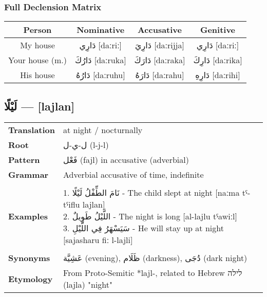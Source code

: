 \documentclass[letterpaper,12pt]{article}
\begin{document}
\subsubsection*{Full Declension Matrix}
\begin{tabular}{|c|c|c|c|}
\hline
\textbf{Person} & \textbf{Nominative} & \textbf{Accusative} & \textbf{Genitive} \\
\hline
My house & \textarabic{دَارِي} [daːriː] & \textarabic{دَارِيَ} [daːrijja] & \textarabic{دَارِي} [daːriː] \\
\hline
Your house (m.) & \textarabic{دَارُكَ} [daːruka] & \textarabic{دَارَكَ} [daːraka] & \textarabic{دَارِكَ} [daːrika] \\
\hline
His house & \textarabic{دَارُهُ} [daːruhu] & \textarabic{دَارَهُ} [daːrahu] & \textarabic{دَارِهِ} [daːrihi] \\
\hline
\end{tabular}

\subsection{\textarabic{لَيْلًا} — [lajlan]}
\begin{tabular}{p{3cm}p{10cm}}
\toprule
\textbf{Translation} & at night / nocturnally \\
\textbf{Root} & \textarabic{ل-ي-ل} (l-j-l) \\
\textbf{Pattern} & \textarabic{فَعْل} (fajl) in accusative (adverbial) \\
\textbf{Grammar} & Adverbial accusative of time, indefinite \\
\midrule \\
\textbf{Examples} & \makecell[l]{\parbox{9.5cm}{
1. \textarabic{نَامَ الطِّفْلُ لَيْلًا} - The child slept at night [naːma tˤ-tˤiflu lajlan]\\
2. \textarabic{اللَّيْلُ طَوِيلٌ} - The night is long [al-lajlu tˤawiːl]\\
3. \textarabic{سَيَسْهَرُ فِي اللَّيْلِ} - He will stay up at night [sajasharu fiː l-lajli]
}} \\
\midrule \\
\textbf{Synonyms} & \textarabic{عَشِيَّة} (evening), \textarabic{ظَلَام} (darkness), \textarabic{دُجَى} (dark night) \\
\textbf{Etymology} & From Proto-Semitic *lajl-, related to Hebrew \texthebrew{לילה} (lajla) "night" \\
\bottomrule
\end{tabular}
\end{document}
